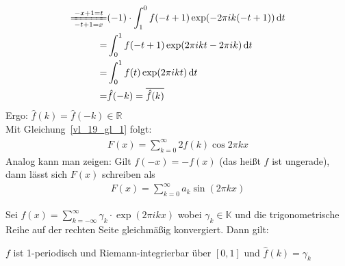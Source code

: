 \begin{Bemerkung}
{\begin{itemize}
\begin{align*}
			 \xlongequal[-t+1=x]{-x+1 = t} &(-1) \cdot \int_1^0 f(-t+1) 
			 	\exp(-2\pi ik (-t+1)) \dd{t} \\
			 = & \int_0^1 f(-t+1)\exp(2\pi i k t - 2\pi ik)  \dd{t} \\
			 = & \int_0^1 f(t) \exp(2\pi ikt) \dd{t} \\
			 = & \hat{f}(-k) = \overline{\hat{f}(k)}
		\end{align*}
		Ergo: $\hat{f}(k) = \hat{f}(-k) \in \mathbb{R}$ \\
		Mit Gleichung~\ref{vl_19_gl_1} folgt:
		\begin{align*}
			 F(x) = \sum_{k=0}^{\infty}  2 \hat{f}(k) \cos 2 \pi k x
		\end{align*}
		Analog kann man zeigen: Gilt $f(-x) = - f(x)$ 
		(das heißt $f$ ist ungerade), 
		dann lässt sich $F(x)$ schreiben als
		\begin{align*}
			F(x) = \sum_{k=0}^{\infty}a_k \sin(2\pi k x)
		\end{align*}		 
	\end{itemize}
}\end{Bemerkung}

\begin{Proposition}{%
	Sei $f(x) = \sum_{k = -\infty}^{\infty} \gamma_k \cdot \exp(2\pi i k x)$ wobei 
	$\gamma_k \in \mathbb{K}$ und die trigonometrische Reihe auf der rechten Seite 
	gleichmäßig konvergiert. Dann gilt:
	\begin{center}
		$f$ ist 1-periodisch und Riemann-integrierbar über $[0,1]$ und 
		$\hat{f}(k) = \gamma_k$
	\end{center}
}\end{Proposition}

